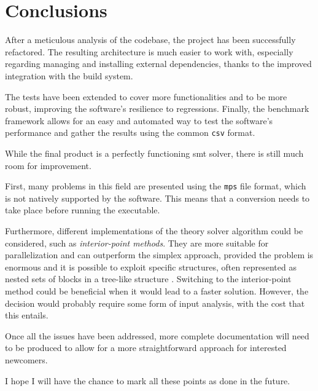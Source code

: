 \chapter{Conclusions}

After a meticulous analysis of the codebase, the project has been successfully refactored.
The resulting architecture is much easier to work with, especially regarding managing and installing external dependencies, thanks to the improved integration with the \bazel build system.

The tests have been extended to cover more functionalities and to be more robust, improving the software's resilience to regressions.
Finally, the benchmark framework allows for an easy and automated way to test the software's performance and gather the results using the common \texttt{csv} format.

While the final product is a perfectly functioning \gls{smt} solver, there is still much room for improvement.

First, many problems in this field are presented using the \texttt{mps} file format, which is not natively supported by the software.
This means that a conversion needs to take place before running the executable.

Furthermore, different implementations of the theory solver algorithm could be considered, such as \textit{interior-point methods}.
They are more suitable for parallelization and can outperform the simplex approach, provided the problem is enormous and it is possible to exploit specific structures, often represented as nested sets of blocks in a tree-like structure \cite{paper:parallel-interior-point}.
Switching to the interior-point method could be beneficial when it would lead to a faster solution.
However, the decision would probably require some form of input analysis, with the cost that this entails.

Once all the issues have been addressed, more complete documentation will need to be produced to allow for a more straightforward approach for interested newcomers.

I hope I will have the chance to mark all these points as done in the future.
